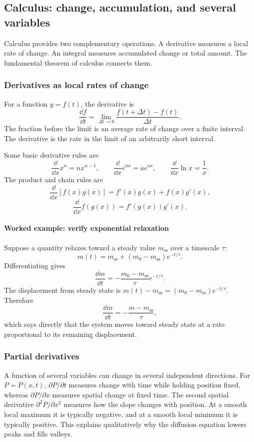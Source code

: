 \subsection{Calculus: change, accumulation, and several variables}
\label{math:calculus}

Calculus provides two complementary operations.
A derivative measures a local rate of change.
An integral measures accumulated change or total amount.
The fundamental theorem of calculus connects them.

\subsubsection{Derivatives as local rates of change}

For a function $y=f(t)$, the derivative is
\[
    \frac{\dd f}{\dd t}=\lim_{\Delta t\rightarrow0}\frac{f(t+\Delta t)-f(t)}{\Delta t}.
\]
The fraction before the limit is an average rate of change over a finite interval.
The derivative is the rate in the limit of an arbitrarily short interval.

Some basic derivative rules are
\[
    \frac{\dd}{\dd x}x^n=nx^{n-1}, \qquad \frac{\dd}{\dd x}e^{ax}=ae^{ax}, \qquad \frac{\dd}{\dd x}\ln x=\frac{1}{x}.
\]
The product and chain rules are
\[
    \frac{\dd}{\dd x}[f(x)g(x)]=f'(x)g(x)+f(x)g'(x),
\]
\[
    \frac{\dd}{\dd x}f(g(x))=f'(g(x))g'(x).
\]

\paragraph{Worked example: verify exponential relaxation}
Suppose a quantity relaxes toward a steady value $m_{\mathrm{ss}}$ over a timescale $\tau$:
\[
    m(t)=m_{\mathrm{ss}}+(m_0-m_{\mathrm{ss}})e^{-t/\tau}.
\]
Differentiating gives
\[
    \frac{\dd m}{\dd t}=-\frac{m_0-m_{\mathrm{ss}}}{\tau}e^{-t/\tau}.
\]
The displacement from steady state is $m(t)-m_{\mathrm{ss}}=(m_0-m_{\mathrm{ss}})e^{-t/\tau}$.
Therefore
\[
    \frac{\dd m}{\dd t}=-\frac{m-m_{\mathrm{ss}}}{\tau},
\]
which says directly that the system moves toward steady state at a rate proportional to its remaining displacement.

\subsubsection{Partial derivatives}

A function of several variables can change in several independent directions.
For $P=P(x,t)$, $\partial P/\partial t$ measures change with time while holding position fixed, whereas $\partial P/\partial x$ measures spatial change at fixed time.
The second spatial derivative $\partial^2P/\partial x^2$ measures how the slope changes with position.
At a smooth local maximum it is typically negative, and at a smooth local minimum it is typically positive.
This explains qualitatively why the diffusion equation lowers peaks and fills valleys.

